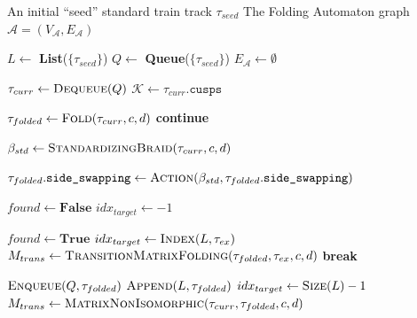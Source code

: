 \begin{algorithm}[p]
\caption{autofolder: Automaton Generation Implementation (Full Graph)}
\label{alg:autofolder_impl}
\begin{algorithmic}[1]
\Require An initial ``seed'' standard train track $\tau_{seed}$
\Ensure The Folding Automaton graph $\mathcal{A} = (V_{\mathcal{A}}, E_{\mathcal{A}})$

\State $L \gets$ \textbf{List}($\{ \tau_{seed} \}$) 
\State $Q \gets$ \textbf{Queue}($\{ \tau_{seed} \}$) 
\State $E_{\mathcal{A}} \gets \emptyset$

    \State $\tau_{curr} \gets \Call{Dequeue}{Q}$
    \State $\mathcal{K} \gets \tau_{curr}.\texttt{cusps}$

            \State {}
            \State $\tau_{folded} \gets \Call{Fold}{\tau_{curr}, c, d}$
             \textbf{continue} \EndIf

            \State {}
            \State $\beta_{std} \gets \Call{StandardizingBraid}{\tau_{curr}, c, d}$

            \State {}
            \State {}
            \State $\tau_{folded}.\texttt{side\_swapping} \gets \Call{Action}{\beta_{std}, \tau_{folded}.\texttt{side\_swapping}}$

            \State {}
            \State $found \gets \textbf{False}$
            \State $idx_{target} \gets -1$

                    \State $found \gets \textbf{True}$
                    \State $idx_{target} \gets \Call{Index}{L, \tau_{ex}}$
                    \State {}
                    \State $M_{trans} \gets \Call{TransitionMatrixFolding}{\tau_{folded}, \tau_{ex}, c, d}$
                    \State \textbf{break}
                \EndIf
            \EndFor

                \State {}
                \State $\Call{Enqueue}{Q, \tau_{folded}}$
                \State $\Call{Append}{L, \tau_{folded}}$
                \State $idx_{target} \gets \Call{Size}{L} - 1$
                \State {}
                \State $M_{trans} \gets \Call{MatrixNonIsomorphic}{\tau_{curr}, \tau_{folded}, c, d}$
            \EndIf


\end{algorithmic}
\end{algorithm}
